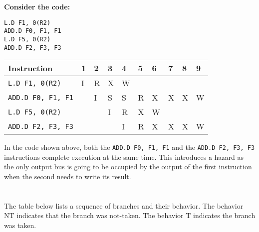 \documentclass{article}
\begin{document}
\begin{adjustwidth}{2.5em}{0pt}
\vspace{5mm} 
\textbf{Consider the code: } 
\begin{lstlisting} 
L.D F1, 0(R2)
ADD.D F0, F1, F1
L.D F5, 0(R2)
ADD.D F2, F3, F3
\end{lstlisting} 

\vspace{3mm}
\begin{tabular}{|l|l|l|l|l|l|l|l|l|l|} 
\hline
\textbf{Instruction}& \textbf{1}& \textbf{2} & \textbf{3} & \textbf{4} & \textbf{5} & \textbf{6} & \textbf{7} & \textbf{8} & \textbf{9}\\
\hline
\texttt{L.D F1, 0(R2)} & I & R & X & W & & & & &\\ 
\texttt{ADD.D F0, F1, F1} & & I & S & S & R & X & X & X & W\\
\texttt{L.D F5, 0(R2)} & & & I & R & X & W & & &\\
\texttt{ADD.D F2, F3, F3} & & & & I & R & X & X & X & W\\
\hline
\end{tabular}

\vspace{3mm}
In the code shown above, both the \texttt{ADD.D F0, F1, F1} and the \texttt{ADD.D F2, F3, F3} instructions complete execution at the same time. This introduces a hazard as the only output bus is going to be occupied by the output of the first instruction when the second needs to write its result.
\end{adjustwidth}
\section{}
The table below lists a sequence of branches and their behavior.  The behavior NT indicates that the branch was not-taken.  The behavior T indicates the branch was taken.
\end{document}
